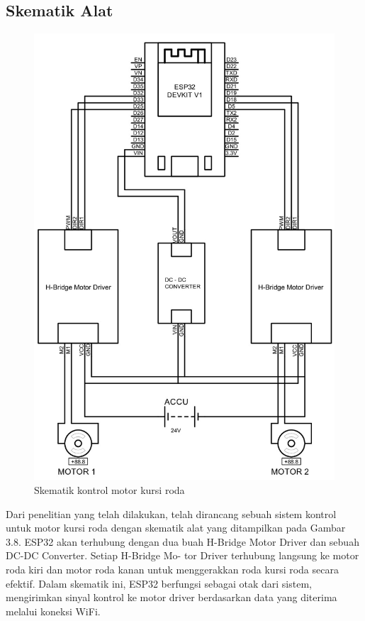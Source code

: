 \subsection{Skematik Alat}
\begin{figure} [H] \centering
  \includegraphics[scale=0.4]{gambar/skematik alat.jpg}
  \caption{Skematik kontrol motor kursi roda\cite{ekatama2024perancangan}}
  \label{fig:skematik kontrol}
\end{figure}

Dari penelitian yang telah dilakukan, telah dirancang sebuah sistem kontrol untuk motor
kursi roda dengan skematik alat yang ditampilkan pada Gambar 3.8. ESP32 akan terhubung
dengan dua buah H-Bridge Motor Driver dan sebuah DC-DC Converter. Setiap H-Bridge Mo-
tor Driver terhubung langsung ke motor roda kiri dan motor roda kanan untuk menggerakkan
roda kursi roda secara efektif. Dalam skematik ini, ESP32 berfungsi sebagai otak dari sistem, mengirimkan sinyal kontrol ke motor driver berdasarkan data yang diterima melalui koneksi WiFi\cite{ekatama2024perancangan}.

